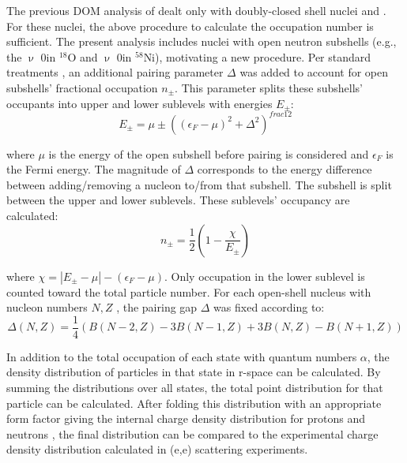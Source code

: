 \begin{equation}
    [insert spectroscopic factor calculation]
\end{equation}

The previous DOM analysis of \cite{MahzoonPhDThesis, Atkinson2018} dealt only with doubly-closed shell nuclei
\caForty and \caEight. For these nuclei, the above procedure to calculate the occupation number is
sufficient. The present analysis includes nuclei with open neutron subshells
(e.g., the $\upnu$ 0\dFive in $^{18}$O and $\upnu$ 0\fFive in $^{58}$Ni), motivating a new
procedure. Per standard treatments \cite{WalterRef}, an additional
pairing parameter $\Delta$ was added to account for open subshells' fractional occupation $n_{\pm}$.
This parameter splits these subshells' occupants into upper and lower sublevels with energies $E_{\pm}$:
\begin{equation}
    E_{\pm} = \mu \pm ((\epsilon_{F}-\mu)^{2} + \Delta^{2})^{frac{1}{2}}
\end{equation}

\noindent
where $\mu$ is the energy of the open subshell before pairing is considered and
$\epsilon_{F}$ is the Fermi
energy. The magnitude of $\Delta$ corresponds to the energy difference between
adding/removing a nucleon to/from that subshell. The subshell
is split between the upper and lower sublevels. These sublevels' occupancy are calculated:
\begin{equation}
    n_{\pm} = \frac{1}{2}\left( 1-\frac{\chi}{E_{\pm}}\right)
\end{equation}

\noindent
where $\chi = |E_{\pm}-\mu| - (\epsilon_{F} - \mu)$. Only occupation in the
lower sublevel is counted toward the total particle number. For each open-shell
nucleus with nucleon numbers $N, Z$ , the pairing gap $\Delta$ was fixed according to:
\begin{equation}
    \Delta(N,Z) = \frac{1}{4}\left(B(N-2,Z)-3B(N-1,Z) + 3B(N,Z)-B(N+1,Z)\right)
\end{equation}

In addition to the total occupation of each state with quantum numbers $\alpha$,
the density distribution of particles in that state in r-space can be calculated. By summing the
distributions over all states, the total point distribution for that particle can be calculated.
After folding this distribution with an appropriate form factor giving the internal charge density
distribution for protons and neutrons \cite{FormFactorPaper}, the final distribution can be compared
to the experimental charge density distribution calculated in (e,e) scattering experiments.

